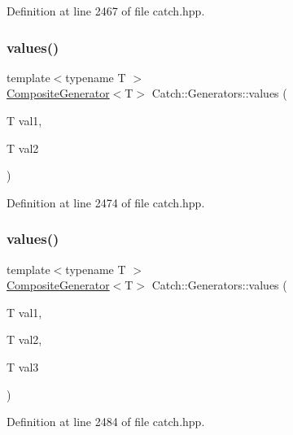 Definition at line 2467 of file catch.\+hpp.

\hypertarget{namespace_catch_1_1_generators_a7a2c5bebb3c06c5b0ca05a80289b9eb1}{}\label{namespace_catch_1_1_generators_a7a2c5bebb3c06c5b0ca05a80289b9eb1} 
\subsubsection{\texorpdfstring{values()}{values()}\hspace{0.1cm}{\footnotesize\ttfamily [1/3]}}
{\footnotesize\ttfamily template$<$typename T $>$ \\
\hyperlink{class_catch_1_1_composite_generator}{Composite\+Generator}$<$T$>$ Catch\+::\+Generators\+::values (\begin{DoxyParamCaption}\item[{T}]{val1,  }\item[{T}]{val2 }\end{DoxyParamCaption})}



Definition at line 2474 of file catch.\+hpp.

\hypertarget{namespace_catch_1_1_generators_a496c4a826107e47203b6c609cfd8c2c5}{}\label{namespace_catch_1_1_generators_a496c4a826107e47203b6c609cfd8c2c5} 
\subsubsection{\texorpdfstring{values()}{values()}\hspace{0.1cm}{\footnotesize\ttfamily [2/3]}}
{\footnotesize\ttfamily template$<$typename T $>$ \\
\hyperlink{class_catch_1_1_composite_generator}{Composite\+Generator}$<$T$>$ Catch\+::\+Generators\+::values (\begin{DoxyParamCaption}\item[{T}]{val1,  }\item[{T}]{val2,  }\item[{T}]{val3 }\end{DoxyParamCaption})}



Definition at line 2484 of file catch.\+hpp.

\hypertarget{namespace_catch_1_1_generators_afb1dcf02bfc8cdf990f27fdc7d7e4a4e}{}\label{namespace_catch_1_1_generators_afb1dcf02bfc8cdf990f27fdc7d7e4a4e} 

